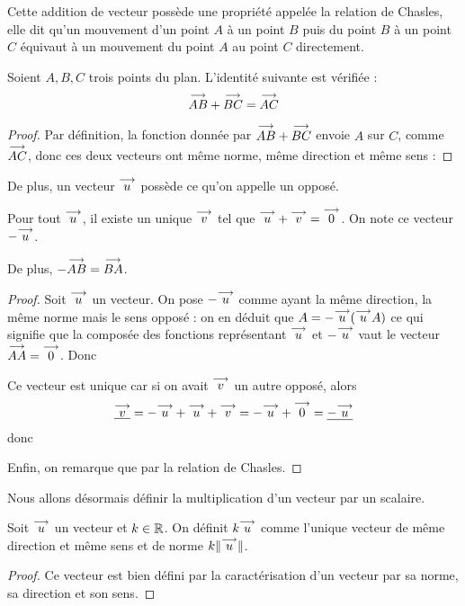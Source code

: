 Cette addition de vecteur possède une propriété appelée la relation de Chasles, elle dit qu'un mouvement d'un point $A$ à un point $B$ puis du point $B$ à un point $C$ équivaut à un mouvement du point $A$ au point $C$ directement.

\begin{prop}
    Soient $A,B,C$ trois points du plan. L'identité suivante est vérifiée :
    $$\overset{\longrightarrow}{AB}+\overset{\longrightarrow}{BC}=\overset{\longrightarrow}{AC}$$
\end{prop}
\begin{proof}
    Par définition, la fonction donnée par $\overset{\longrightarrow}{AB}+\overset{\longrightarrow}{BC}$ envoie $A$ sur $C$, comme $\overset{\longrightarrow}{AC}$, donc ces deux vecteurs ont même norme, même direction et même sens : 
\end{proof}


De plus, un vecteur $\overset{\longrightarrow}{u}$ possède ce qu'on appelle un opposé.

\begin{prop}
    Pour tout $\overset{\longrightarrow}{u}$, il existe un unique $\overset{\longrightarrow}{v}$ tel que $\overset{\longrightarrow}{u} + \overset{\longrightarrow}{v} = \overset{\longrightarrow}{0}$. On note ce vecteur $-\overset{\longrightarrow}{u}$.
    
    De plus, $-\overset{\longrightarrow}{AB}=\overset{\longrightarrow}{BA}$.
\end{prop}
\begin{proof}
    Soit $\overset{\longrightarrow}{u}$ un vecteur. On pose $-\overset{\longrightarrow}{u}$ comme ayant la même direction, la même norme mais le sens opposé : on en déduit que $A=-\overset{\longrightarrow}{u} (\overset{\longrightarrow}{u} A)$ ce qui signifie que la composée des fonctions représentant $\overset{\longrightarrow}{u}$ et $-\overset{\longrightarrow}{u}$ vaut le vecteur $\overset{\longrightarrow}{AA}=\overset{\longrightarrow}{0}$. Donc 
    
    Ce vecteur est unique car si on avait $\overset{\longrightarrow}{v}$ un autre opposé, alors $$\underline{\overset{\longrightarrow}{v}}=-\overset{\longrightarrow}{u} + \overset{\longrightarrow}{u} + \overset{\longrightarrow}{v} = -\overset{\longrightarrow}{u} + \overset{\longrightarrow}{0} = \underline{-\overset{\longrightarrow}{u}}$$ donc 
    
    Enfin, on remarque que  par la relation de Chasles.
\end{proof}

Nous allons désormais définir la multiplication d'un vecteur par un scalaire.

\begin{defi}
    Soit $\overset{\longrightarrow}{u}$ un vecteur et $k\in \mathbb{R}$. On définit $k\overset{\longrightarrow}{u}$ comme l'unique vecteur de même direction et même sens et de norme $k\|\overset{\longrightarrow}{u}\|$.
\end{defi}
\begin{proof}
    Ce vecteur est bien défini par la caractérisation d'un vecteur par sa norme, sa direction et son sens.
\end{proof}

